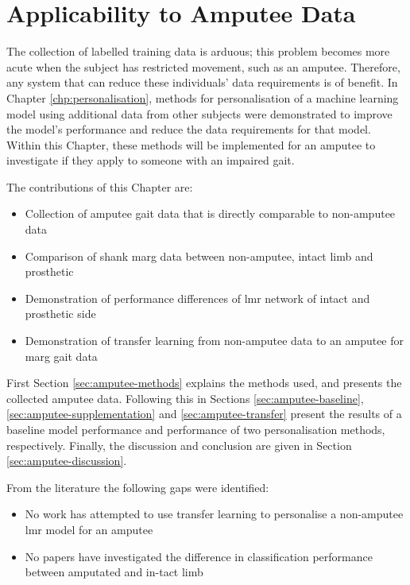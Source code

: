 \chapter{Applicability to Amputee Data}
\label{chp:amputee-data}

The collection of labelled training data is arduous; this problem becomes more acute when the subject has restricted movement, such as an amputee. Therefore, any system that can reduce these individuals' data requirements is of benefit. In Chapter \ref{chp:personalisation}, methods for personalisation of a machine learning model using additional data from other subjects were demonstrated to improve the model's performance and reduce the data requirements for that model. Within this Chapter, these methods will be implemented for an amputee to investigate if they apply to someone with an impaired gait.

The contributions of this Chapter are:
\begin{itemize}
    \item Collection of amputee gait data that is directly comparable to non-amputee data
    \item Comparison of shank \acrshort{marg} data between non-amputee, intact limb and prosthetic
    \item Demonstration of performance differences of \acrshort{lmr} network of intact and prosthetic side
    \item Demonstration of transfer learning from non-amputee data to an amputee for \acrshort{marg} gait data
\end{itemize}

First Section \ref{sec:amputee-methods} explains the methods used, and presents the collected amputee data. Following this in Sections \ref{sec:amputee-baseline}, \ref{sec:amputee-supplementation} and \ref{sec:amputee-transfer} present the results of a baseline model performance and performance of two personalisation methods, respectively. Finally, the discussion and conclusion are given in Section \ref{sec:amputee-discussion}.

From the literature the following gaps were identified:
\begin{itemize}
    \item No work has attempted to use transfer learning to personalise a non-amputee \acrshort{lmr} model for an amputee
    \item No papers have investigated the difference in classification performance between amputated and in-tact limb
\end{itemize}

